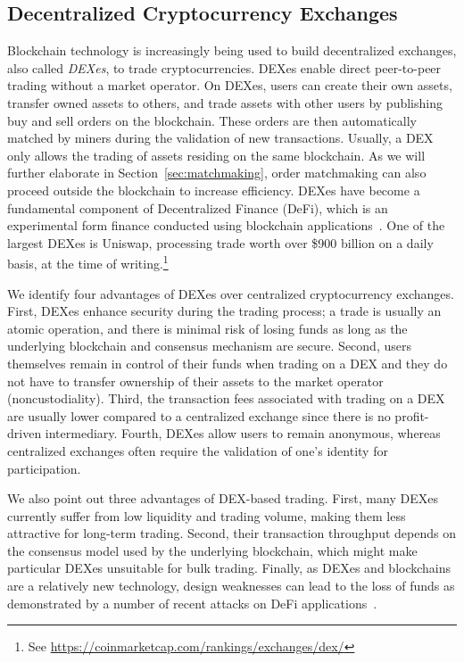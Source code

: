 
\subsection{Decentralized Cryptocurrency Exchanges}
Blockchain technology is increasingly being used to build decentralized exchanges, also called \emph{DEXes}, to trade cryptocurrencies.
DEXes enable direct peer-to-peer trading without a market operator.
On DEXes, users can create their own assets, transfer owned assets to others, and trade assets with other users by publishing buy and sell orders on the blockchain.
These orders are then automatically matched by miners during the validation of new transactions.
Usually, a DEX only allows the trading of assets residing on the same blockchain.
As we will further elaborate in Section~\ref{sec:matchmaking}, order matchmaking can also proceed outside the blockchain to increase efficiency.
DEXes have become a fundamental component of Decentralized Finance (DeFi), which is an experimental form finance conducted using blockchain applications~\cite{chen2020blockchain}.
One of the largest DEXes is Uniswap, processing trade worth over \$900 billion on a daily basis, at the time of writing.\footnote{See \url{https://coinmarketcap.com/rankings/exchanges/dex/}}

We identify four advantages of DEXes over centralized cryptocurrency exchanges.
First, DEXes enhance security during the trading process; a trade is usually an atomic operation, and there is minimal risk of losing funds as long as the underlying blockchain and consensus mechanism are secure.
Second, users themselves remain in control of their funds when trading on a DEX and they do not have to transfer ownership of their assets to the market operator (noncustodiality).
Third, the transaction fees associated with trading on a DEX are usually lower compared to a centralized exchange since there is no profit-driven intermediary.
Fourth, DEXes allow users to remain anonymous, whereas centralized exchanges often require the validation of one's identity for participation.

We also point out three advantages of DEX-based trading.
First, many DEXes currently suffer from low liquidity and trading volume, making them less attractive for long-term trading.
Second, their transaction throughput depends on the consensus model used by the underlying blockchain, which might make particular DEXes unsuitable for bulk trading.
Finally, as DEXes and blockchains are a relatively new technology, design weaknesses can lead to the loss of funds as demonstrated by a number of recent attacks on DeFi applications~\cite{gudgeon2020decentralized,qin2020attacking}.

